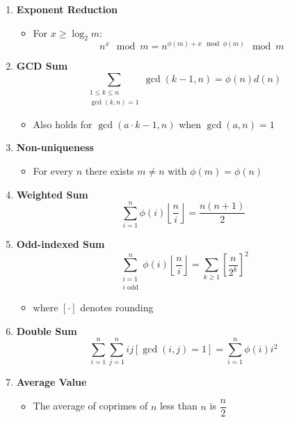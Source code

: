\begin{enumerate}[leftmargin=*]
    \item \textbf{Exponent Reduction}
        \begin{itemize}
            \item For $x \geq \log_2 m$:
            \[n^x \mod m = n^{\phi(m) + x \mod \phi(m)} \mod m\]
        \end{itemize}
    
    \item \textbf{GCD Sum}
        \[\sum_{\substack{1 \leq k \leq n \\ \gcd(k,n)=1}} \gcd(k-1, n) = \phi(n)d(n)\]
        \begin{itemize}
            \item Also holds for $\gcd(a \cdot k - 1, n)$ when $\gcd(a,n) = 1$
        \end{itemize}
    
    \item \textbf{Non-uniqueness}
        \begin{itemize}
            \item For every $n$ there exists $m \neq n$ with $\phi(m) = \phi(n)$
        \end{itemize}
    
    \item \textbf{Weighted Sum}
        \[\sum_{i=1}^n \phi(i)\left\lfloor\frac{n}{i}\right\rfloor = \frac{n(n+1)}{2}\]
    
    \item \textbf{Odd-indexed Sum}
        \[\sum_{\substack{i=1 \\ i \text{ odd}}}^n \phi(i)\left\lfloor\frac{n}{i}\right\rfloor = \sum_{k \geq 1}\left[\frac{n}{2^k}\right]^2\]
        \begin{itemize}
            \item where $[\cdot]$ denotes rounding
        \end{itemize}
    
    \item \textbf{Double Sum}
        \[\sum_{i=1}^n \sum_{j=1}^n ij[\gcd(i,j)=1] = \sum_{i=1}^n \phi(i)i^2\]
    
    \item \textbf{Average Value}
        \begin{itemize}
            \item The average of coprimes of $n$ less than $n$ is $\dfrac{n}{2}$
        \end{itemize}
\end{enumerate}
